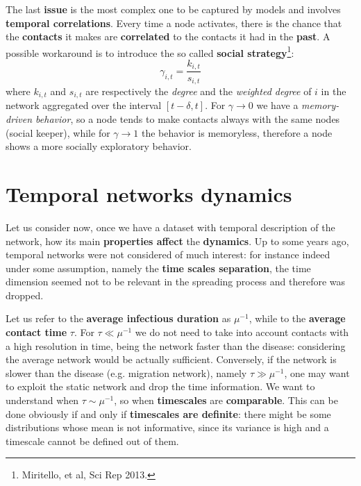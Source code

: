 \documentclass[../main/main.tex]{subfiles}
\begin{document}
The last \textbf{issue} is the most complex one to be captured by models and involves \textbf{temporal correlations}. Every time a node activates, there is the chance that the \textbf{contacts} it makes are \textbf{correlated} to the contacts it had in the \textbf{past}. A possible workaround is to introduce the so called \textbf{social strategy}\footnote{Miritello, et al, Sci Rep 2013.}:
\begin{equation}
    \gamma_{i,t} = \frac{k_{i,t}}{s_{i,t}}
\end{equation}
where $k_{i,t}$ and $s_{i,t}$ are respectively the \textit{degree} and the \textit{weighted degree} of $i$ in the network aggregated over the interval $[t-\delta, t]$. For $\gamma \to 0$ we have a \textit{memory-driven behavior}, so a node tends to make contacts always with the same nodes (social keeper), while for $\gamma \to 1$ the behavior is memoryless, therefore a node shows a more socially exploratory behavior.





\section{Temporal networks dynamics}

Let us consider now, once we have a dataset with temporal description of the network, how its main \textbf{properties affect} the \textbf{dynamics}. Up to some years ago, temporal networks were not considered of much interest: for instance indeed under some assumption, namely the \textbf{time scales separation}, the time dimension seemed not to be relevant in the spreading process and therefore was dropped.

Let us refer to the \textbf{average infectious duration} as $\mu^{-1}$, while to the \textbf{average contact time} $\tau$. For $\tau \ll \mu^{-1}$ we do not need to take into account contacts with a high resolution in time, being the network faster than the disease: considering the average network would be actually sufficient. Conversely, if the network is slower than the disease (e.g. migration network), namely $ \tau \gg \mu^{-1} $, one may want to exploit the static network and drop the time information. We want to understand when $\tau \sim \mu^{-1}$, so when \textbf{timescales} are \textbf{comparable}. This can be done obviously if and only if \textbf{timescales are definite}: there might be some distributions whose mean is not informative, since its variance is high and a timescale cannot be defined out of them.
\end{document}
